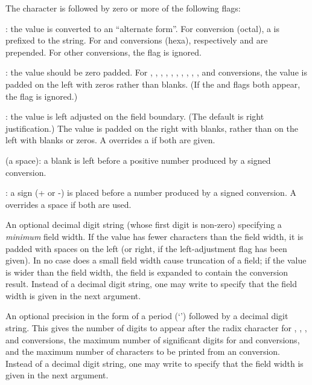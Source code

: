{ The character \kbd{\%} is followed by zero or
more of the following flags:

\item \kbd{\#}: the value is converted to an ``alternate form''. For
 conversion (octal), a  is prefixed to the string. For 
and  conversions (hexa), respectively  and  are
prepended. For other conversions, the flag is ignored.

\item {}: the value should be zero padded. For
,
,
,
,
,
,
,
,
,
, and
 conversions, the value is padded on the left with zeros rather than
blanks. (If the  and \kbd{-} flags both appear, the  flag is
ignored.)

\item \kbd{-}: the value is left adjusted on the field boundary. (The
default is right justification.) The value is padded on the right with
blanks, rather than on the left with blanks or zeros. A \kbd{-} overrides a
 if both are given.

\item {} (a space): a blank is left before a positive number
produced by a signed conversion.

\item \kbd{+}: a sign (+ or -) is placed before a number produced by a
signed conversion. A \kbd{+} overrides a space if both are used.

 An optional decimal digit string (whose first
digit is non-zero) specifying a \emph{minimum} field width. If the value has
fewer characters than the field width, it is padded with spaces on the left
(or right, if the left-adjustment flag has been given). In no case does a
small field width cause truncation of a field; if the value is wider than
the field width, the field is expanded to contain the conversion result.
Instead of a decimal digit string, one may write \kbd{*} to specify that the
field width is given in the next argument.

 An optional precision in the form of a period
(`') followed by a decimal digit string. This gives
the number of digits to appear after the radix character for ,
, , and  conversions, the maximum number of significant
digits for  and  conversions, and the maximum number of
characters to be printed from an  conversion.
Instead of a decimal digit string, one may write \kbd{*} to specify that the
field width is given in the next argument.

}
